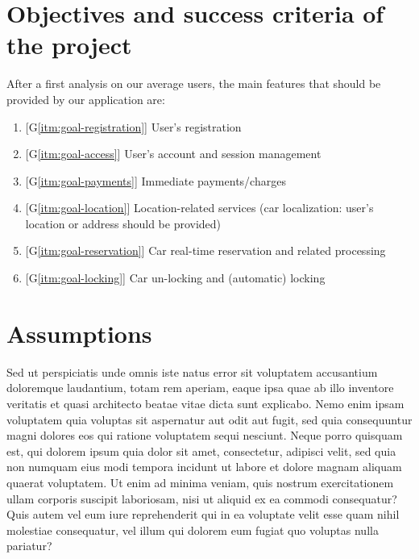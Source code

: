 \section{Objectives and success criteria of the project}
\label{sec: proj_objectives}
After a first analysis on our average users, the main features that should be provided by our application are:
\begin{enumerate}
	\item{[G\ref{itm:goal-registration}] User's registration}\label{itm:goal-registration}
	\item{[G\ref{itm:goal-access}] User's account and session management}\label{itm:goal-access}
	\item{[G\ref{itm:goal-payments}] Immediate payments/charges}\label{itm:goal-payments}
	\item{[G\ref{itm:goal-location}] Location-related services (car localization: user's location or address should be provided)}\label{itm:goal-location}
	\item{[G\ref{itm:goal-reservation}] Car real-time reservation and related processing}\label{itm:goal-reservation}
	\item{[G\ref{itm:goal-locking}] Car un-locking and (automatic) locking}\label{itm:goal-locking}
\end{enumerate}

\section{Assumptions}
Sed ut perspiciatis unde omnis iste natus error sit voluptatem accusantium doloremque laudantium, totam rem aperiam, 
eaque ipsa quae ab illo inventore veritatis et quasi architecto beatae vitae dicta sunt explicabo. 
Nemo enim ipsam voluptatem quia voluptas sit aspernatur aut odit aut fugit, sed quia consequuntur magni 
dolores eos qui ratione voluptatem sequi nesciunt. Neque porro quisquam est, qui dolorem ipsum quia dolor sit amet, 
consectetur, adipisci velit, sed quia non numquam eius modi tempora incidunt ut labore et dolore magnam aliquam quaerat voluptatem. 
Ut enim ad minima veniam, quis nostrum exercitationem ullam corporis suscipit laboriosam, nisi ut aliquid ex ea commodi consequatur? 
Quis autem vel eum iure reprehenderit qui in ea voluptate velit esse quam nihil molestiae consequatur, 
vel illum qui dolorem eum fugiat quo voluptas nulla pariatur?


